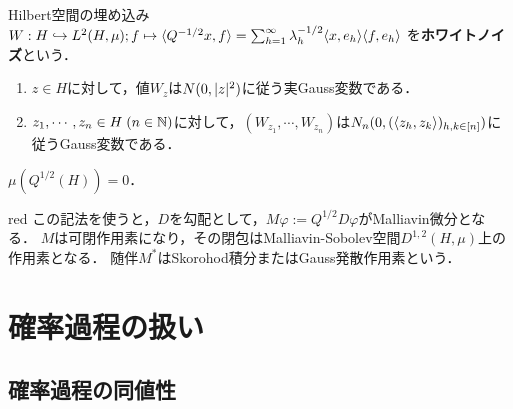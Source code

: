 \documentclass[uplatex,dvipdfmx]{jsreport}
\begin{document}
\begin{definition}\label{def-white-noise-1}
    Hilbert空間の埋め込み$W:H\hookrightarrow L^2(H,\mu);f\mapsto \langle Q^{-1/2}x,f\rangle=\sum_{h=1}^\infty\lambda_h^{-1/2}\langle x,e_h\rangle\langle f,e_h\rangle$
    を\textbf{ホワイトノイズ}という．
\end{definition}

\begin{proposition}\mbox{}
    \begin{enumerate}
        \item $z\in H$に対して，値$W_z$は$N(0,\lvert z\rvert^2)$に従う実Gauss変数である．
        \item $z_1,\cdots,z_n\in H\;(n\in\mathbb{N})$に対して，$(W_{z_1},\cdots,W_{z_n})$は$N_n(0,(\langle z_h,z_k\rangle)_{h,k\in[n]})$に従うGauss変数である．
    \end{enumerate}
\end{proposition}

\begin{proposition}
    $\mu(Q^{1/2}(H))=0$．
\end{proposition}

\begin{tbox}{red}{}
    この記法を使うと，$D$を勾配として，$M\varphi:=Q^{1/2}D\varphi$がMalliavin微分となる．
    $M$は可閉作用素になり，その閉包はMalliavin-Sobolev空間$D^{1,2}(H,\mu)$上の作用素となる．
    随伴$M^*$はSkorohod積分またはGauss発散作用素という．
\end{tbox}

\section{確率過程の扱い}

\subsection{確率過程の同値性}
\end{document}

